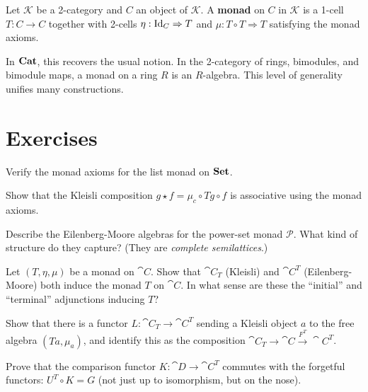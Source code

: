\begin{definition}
Let $\mathcal{K}$ be a 2-category and $C$ an object of $\mathcal{K}$. A \textbf{monad} on $C$ in $\mathcal{K}$ is a 1-cell $T: C \to C$ together with 2-cells $\eta: \mathrm{Id}_C \Rightarrow T$ and $\mu: T \circ T \Rightarrow T$ satisfying the monad axioms.
\end{definition}

In $\mathbf{Cat}$, this recovers the usual notion. In the 2-category of rings, bimodules, and bimodule maps, a monad on a ring $R$ is an $R$-algebra. This level of generality unifies many constructions.

\section{Exercises}

\begin{exercise}
Verify the monad axioms for the list monad on $\mathbf{Set}$.
\end{exercise}

\begin{exercise}
Show that the Kleisli composition $g \star f = \mu_c \circ Tg \circ f$ is associative using the monad axioms.
\end{exercise}

\begin{exercise}
Describe the Eilenberg-Moore algebras for the power-set monad $\mathcal{P}$. What kind of structure do they capture? (They are \emph{complete semilattices}.)
\end{exercise}

\begin{exercise}
Let $(T, \eta, \mu)$ be a monad on $\cat{C}$. Show that $\cat{C}_T$ (Kleisli) and $\cat{C}^T$ (Eilenberg-Moore) both induce the monad $T$ on $\cat{C}$. In what sense are these the ``initial'' and ``terminal'' adjunctions inducing $T$?
\end{exercise}

\begin{exercise}
Show that there is a functor $L: \cat{C}_T \to \cat{C}^T$ sending a Kleisli object $a$ to the free algebra $(Ta, \mu_a)$, and identify this as the composition $\cat{C}_T \to \cat{C} \xrightarrow{F^T} \cat{C}^T$.
\end{exercise}

\begin{exercise}[$\star$]
Prove that the comparison functor $K: \cat{D} \to \cat{C}^T$ commutes with the forgetful functors: $U^T \circ K = G$ (not just up to isomorphism, but on the nose).
\end{exercise}

